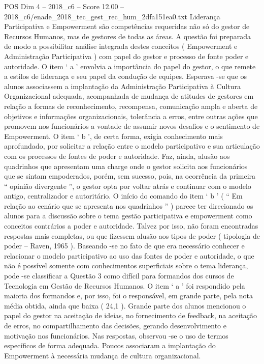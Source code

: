 \begin{textsample}{POS Dim 4 – 2018\_c6 – Score 12.00 – 2018\_c6/enade\_2018\_tec\_gest\_rec\_hum\_2dfa151ea0.txt}
Liderança Participativa e Empowerment são competências requeridas não só do gestor de Recursos Humanos, mas de gestores de todas as áreas.
A questão foi preparada de modo a possibilitar análise integrada destes conceitos ( Empowerment e Administração Participativa ) com papel do gestor e processo de fonte poder e autoridade.
O item ‘ a ’ envolvia a importância do papel do gestor, o que remete a estilos de liderança e seu papel da condução de equipes.
Esperava -se que os alunos associassem a implantação da Administração Participativa à Cultura Organizacional adequada, acompanhada de mudança de atitudes de gestores em relação a formas de reconhecimento, recompensa, comunicação ampla e aberta de objetivos e informações organizacionais, tolerância a erros, entre outras ações que promovem nos funcionários a vontade de assumir novos desafios e o sentimento de Empowerment.
O item ‘ b ’, de certa forma, exigia conhecimento mais aprofundado, por solicitar a relação entre o modelo participativo e sua articulação com os processos de fontes de poder e autoridade.
Faz, ainda, alusão aos quadrinhos que apresentam uma charge onde o gestor solicita aos funcionários que se sintam empoderados, porém, sem sucesso, pois, na ocorrência da primeira “ opinião divergente ”, o gestor opta por voltar atrás e continuar com o modelo antigo, centralizador e autoritário.
O início do comando do item ‘ b ’ ( “ Em relação ao cenário que se apresenta nos quadrinhos ” ) parece ter direcionado os alunos para a discussão sobre o tema gestão participativa e empowerment como conceitos contrários a poder e autoridade.
Talvez por isso, não foram encontradas respostas mais completas, ou que fizessem alusão aos tipos de poder ( tipologia de poder – Raven, 1965 ).
Baseando -se no fato de que era necessário conhecer e relacionar o modelo participativo ao uso das fontes de poder e autoridade, o que não é possível somente com conhecimentos superficiais sobre o tema liderança, pode -se classificar a Questão 3 como difícil para formandos dos cursos de Tecnologia em Gestão de Recursos Humanos.
O item ‘ a ’ foi respondido pela maioria dos formandos e, por isso, foi o responsável, em grande parte, pela nota média obtida, ainda que baixa ( 24,1 ).
Grande parte dos alunos mencionou o papel do gestor na aceitação de ideias, no fornecimento de feedback, na aceitação de erros, no compartilhamento das decisões, gerando desenvolvimento e motivação nos funcionários.
Nas respostas, observou -se o uso de termos específicos de forma adequada.
Poucos associaram a implantação do Empowerment à necessária mudança de cultura organizacional.

\end{textsample}
